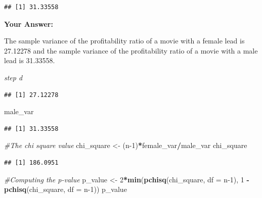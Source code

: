 \documentclass[
]{article}
\newenvironment{Shaded}{\begin{snugshade}}{\end{snugshade}}
\newcommand{\AttributeTok}[1]{\textcolor[rgb]{0.13,0.29,0.53}{#1}}
\newcommand{\CommentTok}[1]{\textcolor[rgb]{0.56,0.35,0.01}{\textit{#1}}}
\newcommand{\DecValTok}[1]{\textcolor[rgb]{0.00,0.00,0.81}{#1}}
\newcommand{\FunctionTok}[1]{\textcolor[rgb]{0.13,0.29,0.53}{\textbf{#1}}}
\newcommand{\NormalTok}[1]{#1}
\newcommand{\OtherTok}[1]{\textcolor[rgb]{0.56,0.35,0.01}{#1}}
\newcommand{\SpecialCharTok}[1]{\textcolor[rgb]{0.81,0.36,0.00}{\textbf{#1}}}
\begin{document}
\begin{verbatim}
## [1] 31.33558
\end{verbatim}

\textbf{Your Answer:}

The sample variance of the profitability ratio of a movie with a female
lead is 27.12278 and the sample variance of the profitability ratio of a
movie with a male lead is 31.33558.

\emph{step d}

\begin{Shaded}
\end{Shaded}

\begin{verbatim}
## [1] 27.12278
\end{verbatim}

\begin{Shaded}
\begin{Highlighting}[]
\NormalTok{male\_var}
\end{Highlighting}
\end{Shaded}

\begin{verbatim}
## [1] 31.33558
\end{verbatim}

\begin{Shaded}
\begin{Highlighting}[]
\CommentTok{\#The chi square value}
\NormalTok{chi\_square }\OtherTok{\textless{}{-}}\NormalTok{ (n}\DecValTok{{-}1}\NormalTok{)}\SpecialCharTok{*}\NormalTok{female\_var}\SpecialCharTok{/}\NormalTok{male\_var}
\NormalTok{chi\_square}
\end{Highlighting}
\end{Shaded}

\begin{verbatim}
## [1] 186.0951
\end{verbatim}

\begin{Shaded}
\begin{Highlighting}[]
\CommentTok{\#Computing the p{-}value}
\NormalTok{p\_value }\OtherTok{\textless{}{-}} \DecValTok{2}\SpecialCharTok{*}\FunctionTok{min}\NormalTok{(}\FunctionTok{pchisq}\NormalTok{(chi\_square, }\AttributeTok{df =}\NormalTok{ n}\DecValTok{{-}1}\NormalTok{), }\DecValTok{1} \SpecialCharTok{{-}} \FunctionTok{pchisq}\NormalTok{(chi\_square, }\AttributeTok{df =}\NormalTok{ n}\DecValTok{{-}1}\NormalTok{))}
\NormalTok{p\_value}
\end{Highlighting}
\end{Shaded}
\end{document}
